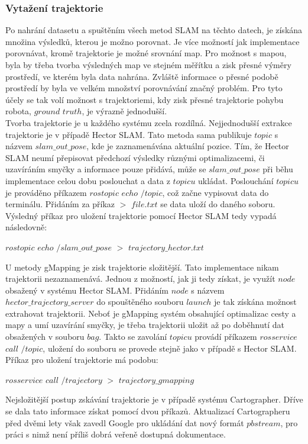 \documentclass[12pt]{article}
\begin{document}
\subsubsection{Vytažení trajektorie}
Po nahrání datasetu a spuštěním všech metod SLAM na těchto datech, je získána množina výsledků, kterou je možno porovnat. Je více možností jak implementace porovnávat, kromě trajektorie je možné srovnání map. Pro možnost s mapou, byla by třeba tvorba výsledných map ve stejném měřítku a zisk přesné výměry prostředí, ve kterém byla data nahrána. Zvláště informace o přesné podobě prostředí by byla ve velkém množství porovnávání značný problém. Pro tyto účely se tak volí možnost s trajektoriemi, kdy zisk přesné trajektorie pohybu robota, $ground$ $truth$, je výrazně jednodušší.\\
\indent Tvorba trajektorie je u každého systému zcela rozdílná. Nejjednodušší extrakce trajektorie je v případě Hector SLAM. Tato metoda sama publikuje $topic$ s názvem $slam\_out\_pose$, kde je zaznamenávána aktuální pozice. Tím, že Hector SLAM neumí přepisovat předchozí výsledky různými optimalizacemi, či uzavíráním smyčky a informace pouze přidává, může se $slam\_out\_pose$ při běhu implementace celou dobu poslouchat a data z $topicu$ ukládat. Poslouchání $topicu$ je prováděno příkazem $rostopic$ $echo$ $/topic$, což začne vypisovat data do terminálu. Přidáním za příkaz $>$ $file.txt$ se data uloží do daného soboru. Výsledný příkaz pro uložení trajektorie pomocí Hector SLAM tedy vypadá následovně:
\begin{center}
	$rostopic$ $echo$ $/slam\_out\_pose$ $>$ $trajectory\_hector.txt$
\end{center}
U metody gMapping je zisk trajektorie složitější. Tato implementace nikam trajektorii nezaznamenává. Jednou z možností, jak ji tedy získat, je využít $node$ obsažený v systému Hector SLAM. Přidáním $node$ s názvem $hector\_trajectory\_server$ do spouštěného souboru $launch$ je tak získána možnost extrahovat trajektorii. Neboť je gMapping systém obsahující optimalizac cesty a mapy a umí uzavírání smyčky, je třeba trajektorii uložit až po doběhnutí dat obsažených v souboru $bag$. Takto se zavolání $topicu$ provádí příkazem $rosservice$ $call$ $/topic$, uložení do souboru se provede stejně jako v případě s Hector SLAM. Příkaz pro uložení trajektorie má podobu:
\begin{center}
	$rosservice$ $call$ $/trajectory$ $>$ $trajectory\_gmapping$
\end{center}
Nejsložitější postup zskávání trajektorie je v případě systému Cartographer. Dříve se dala tato informace získat pomocí dvou příkazů. Aktualizací Cartographeru před dvěmi lety však zavedl Google pro ukládání dat nový formát $pbstream$, pro práci s nimž není příliš dobrá veřeně dostupná dokumentace. 
\end{document}
